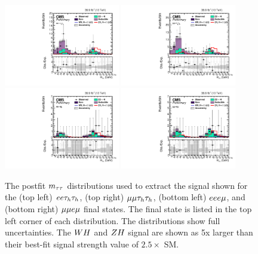 \begin{figure}[h!]
 \begin{center}
  \includegraphics[width=0.45\textwidth]{higgs_to_taus_vh/plots/zh/eett_postfit.pdf}
  \includegraphics[width=0.45\textwidth]{higgs_to_taus_vh/plots/zh/mmtt_postfit.pdf}
  \includegraphics[width=0.45\textwidth]{higgs_to_taus_vh/plots/zh/eeem_postfit.pdf}
  \includegraphics[width=0.45\textwidth]{higgs_to_taus_vh/plots/zh/emmm_postfit.pdf}
 \end{center}
 \caption{The postfit $m_{\tau\tau}$ distributions used to extract the signal shown
  for the (top left) $ee\tau_{h}\tau_{h}$, (top right) $\mu\mu\tau_{h}\tau_{h}$, 
  (bottom left) $eee\mu$, and (bottom right) $\mu\mu e\mu$
  final states. The final state is listed in the
  top left corner of each distribution.
  The distributions show full uncertainties.
  The $WH$ and $ZH$ signal are shown as 5x larger than their best-fit
  signal strength value of $2.5 \times$ SM.
 }
 \label{fig:zh_all_eight2}
\end{figure}

